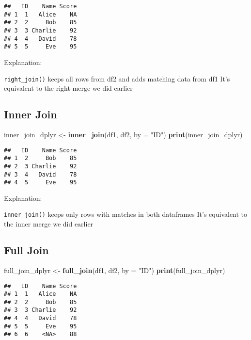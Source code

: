 \documentclass[
]{article}
\newenvironment{Shaded}{\begin{snugshade}}{\end{snugshade}}
\newcommand{\AttributeTok}[1]{\textcolor[rgb]{0.13,0.29,0.53}{#1}}
\newcommand{\FunctionTok}[1]{\textcolor[rgb]{0.13,0.29,0.53}{\textbf{#1}}}
\newcommand{\NormalTok}[1]{#1}
\newcommand{\OtherTok}[1]{\textcolor[rgb]{0.56,0.35,0.01}{#1}}
\newcommand{\StringTok}[1]{\textcolor[rgb]{0.31,0.60,0.02}{#1}}
\begin{document}
\begin{verbatim}
##   ID    Name Score
## 1  1   Alice    NA
## 2  2     Bob    85
## 3  3 Charlie    92
## 4  4   David    78
## 5  5     Eve    95
\end{verbatim}

Explanation:

\texttt{right\_join()} keeps all rows from df2 and adds matching data
from df1 It's equivalent to the right merge we did earlier

\hypertarget{inner-join-1}{%
\subsection{Inner Join}\label{inner-join-1}}

\begin{Shaded}
\begin{Highlighting}[]
\NormalTok{inner\_join\_dplyr }\OtherTok{\textless{}{-}} \FunctionTok{inner\_join}\NormalTok{(df1, df2, }\AttributeTok{by =} \StringTok{"ID"}\NormalTok{)}
\FunctionTok{print}\NormalTok{(inner\_join\_dplyr)}
\end{Highlighting}
\end{Shaded}

\begin{verbatim}
##   ID    Name Score
## 1  2     Bob    85
## 2  3 Charlie    92
## 3  4   David    78
## 4  5     Eve    95
\end{verbatim}

Explanation:

\texttt{inner\_join()} keeps only rows with matches in both dataframes
It's equivalent to the inner merge we did earlier

\hypertarget{full-join}{%
\subsection{Full Join}\label{full-join}}

\begin{Shaded}
\begin{Highlighting}[]
\NormalTok{full\_join\_dplyr }\OtherTok{\textless{}{-}} \FunctionTok{full\_join}\NormalTok{(df1, df2, }\AttributeTok{by =} \StringTok{"ID"}\NormalTok{)}
\FunctionTok{print}\NormalTok{(full\_join\_dplyr)}
\end{Highlighting}
\end{Shaded}

\begin{verbatim}
##   ID    Name Score
## 1  1   Alice    NA
## 2  2     Bob    85
## 3  3 Charlie    92
## 4  4   David    78
## 5  5     Eve    95
## 6  6    <NA>    88
\end{verbatim}
\end{document}
